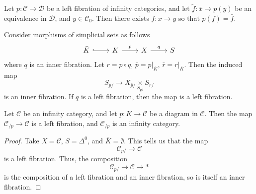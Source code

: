 \documentclass[main.tex]{subfiles}
\begin{document}
%
%
%

\begin{lemma}
  \label{lemma:can_lift_equivalences_along_left_fibrations}
  Let $p\colon \mathcal{C} \to \mathcal{D}$ be a left fibration of infinity categories, and let $\tilde{f}\colon \bar{x} \to p(y)$ be an equivalence in $\mathcal{D}$, and $y \in \mathcal{C}_{0}$. Then there exists $f\colon x \to y$ so that $p(f) = \bar{f}$.
\end{lemma}

\begin{lemma}
  \label{lemma:complicated_thing_is_left_fibration}
  Consider morphisms of simplicial sets as follows
  \begin{equation*}
    \begin{tikzcd}
      \bar{K}
      \arrow[r, hookrightarrow]
      & K
      \arrow[r, "p"]
      & X
      \arrow[r, "q"]
      & S
    \end{tikzcd}
  \end{equation*}
  where $q$ is an inner fibration. Let $r = p \circ q$, $\bar{p} = p|_{\bar{K}}$, $\bar{r} = r|_{\bar{K}}$. Then the induced map
  \begin{equation*}
    S_{p/} \to X_{\bar{p}/} \underset{S_{\bar{p}/}}{\times} S_{r/}
  \end{equation*}
  is an inner fibration. If $q$ is a left fibration, then the map is a left fibration.
\end{lemma}

\begin{corollary}
  Let $\mathcal{C}$ be an infinity category, and let $p\colon K \to \mathcal{C}$ be a diagram in $\mathcal{C}$. Then the map $\mathcal{C}_{/p} \to \mathcal{C}$ is a left fibration, and $\mathcal{C}_{/p}$ is an infinity category.
\end{corollary}
\begin{proof}
  Take $X = \mathcal{C}$, $S = \Delta^{0}$, and $\bar{K} = \emptyset$. This tells us that the map
  \begin{equation*}
    \mathcal{C}_{p/} \to \mathcal{C}
  \end{equation*}
  is a left fibration. Thus, the composition
  \begin{equation*}
    \mathcal{C}_{p/} \to \mathcal{C} \to *
  \end{equation*}
  is the composition of a left fibration and an inner fibration, so is itself an inner fibration.
\end{proof}
\end{document}
